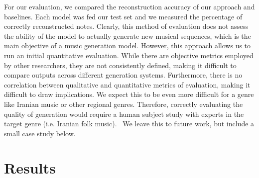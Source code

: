 \documentclass[letterpaper]{article}
\begin{document}
For our evaluation, we compared the reconstruction accuracy of our approach and baselines. 
Each model was fed our test set and we measured the percentage of correctly reconstructed notes.
Clearly, this method of evaluation does not assess the ability of the model to actually generate new musical sequences, which is the main objective of a music generation model. 
However, this approach allows us to run an initial quantitative evaluation. 
While there are objective metrics employed by other researchers, they are not consistently defined, making it difficult to compare outputs across different generation systems. Furthermore, there is no correlation between qualitative and quantitative metrics of evaluation, making it difficult to draw implications. We expect this to be even more difficult for a genre like Iranian music or other regional genres. Therefore, correctly evaluating the quality of generation would require a human subject study with experts in the target genre (i.e. Iranian folk music).~\cite{ji2020comprehensive} 
We leave this to future work, but include a small case study below.

\section{Results}

\begin{table}[tb]
    \centering
    \caption{Training reconstruction accuracy of each approach on each fold}
    \label{table:train_res}
\end{table}
\end{document}
